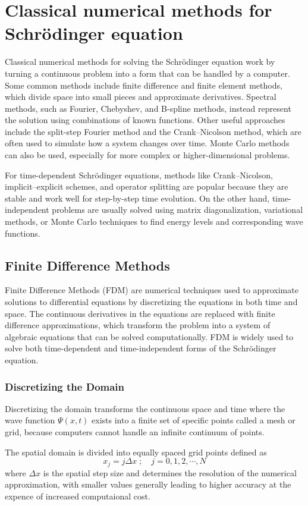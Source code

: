 \documentclass[11pt]{article}
\begin{document}
\section{Classical numerical methods for Schrödinger equation}
Classical numerical methods for solving the Schrödinger equation work by turning a continuous problem into a form that can be handled by a computer. Some common methods include finite difference and finite element methods, which divide space into small pieces and approximate derivatives. Spectral methods, such as Fourier, Chebyshev, and B-spline methods, instead represent the solution using combinations of known functions. Other useful approaches include the split-step Fourier method and the Crank–Nicolson method, which are often used to simulate how a system changes over time. Monte Carlo methods can also be used, especially for more complex or higher-dimensional problems.

For time-dependent Schrödinger equations, methods like Crank–Nicolson, implicit–explicit schemes, and operator splitting are popular because they are stable and work well for step-by-step time evolution. On the other hand, time-independent problems are usually solved using matrix diagonalization, variational methods, or Monte Carlo techniques to find energy levels and corresponding wave functions.

\subsection{Finite Difference Methods}
Finite Difference Methods (FDM) are numerical techniques used to approximate solutions to differential equations by discretizing the equations in both time and space. The continuous derivatives in the equations are replaced with finite difference approximations, which transform the problem into a system of algebraic equations that can be solved computationally. FDM is widely used to solve both time-dependent and time-independent forms of the Schrödinger equation.

\subsubsection{Discretizing the Domain}
Discretizing the domain transforms the continuous space and time where the wave function $\Psi (x,t)$ exists into a finite set of specific points called a mesh or grid, because computers cannot handle an infinite continuum of points.

The spatial domain is divided into equally spaced grid points defined as 
\begin{equation}
	x_j = j \Delta x \; ; \quad j = 0, 1, 2, \cdots , N
\end{equation}
where $\Delta x$ is the spatial step size and determines the resolution of the numerical approximation, with smaller values generally leading to higher accuracy at the expence of increased computaional cost.
\end{document}
